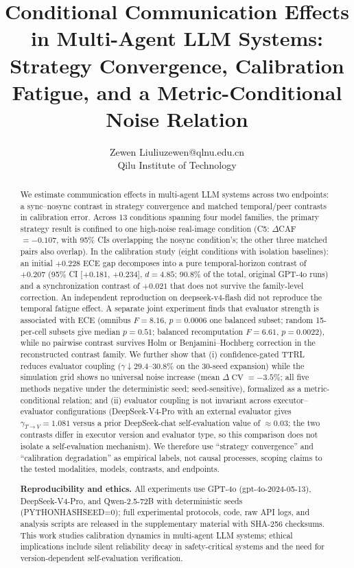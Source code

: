 \documentclass[11pt]{article}
\title{Conditional Communication Effects in Multi-Agent LLM Systems: Strategy Convergence, Calibration Fatigue, and a Metric-Conditional Noise Relation}
\author{\name Zewen Liu\email liuzewen@qlnu.edu.cn\\\addr Qilu Institute of Technology}  %
\date{}
\DeclareMathOperator{\CV}{CV}
\begin{document}
\maketitle

\begin{abstract}
We estimate communication effects in multi-agent LLM systems across two endpoints: a sync--nosync contrast in strategy convergence and matched temporal/peer contrasts in calibration error. Across 13 conditions spanning four model families, the primary strategy result is confined to one high-noise real-image condition (C5: $\Delta$CAF $=-0.107$, with 95\% CIs overlapping the nosync condition's; the other three matched pairs also overlap). In the calibration study (eight conditions with isolation baselines): an initial $+0.228$ ECE gap decomposes into a pure temporal-horizon contrast of $+0.207$ (95\% CI [+0.181, +0.234], $d{=}4.85$; 90.8\% of the total, original GPT-4o runs) and a synchronization contrast of $+0.021$ that does not survive the family-level correction. An independent reproduction on deepseek-v4-flash did not reproduce the temporal fatigue effect. A separate joint experiment finds that evaluator strength is associated with ECE (omnibus $F{=}8.16$, $p{=}0.0006$ one balanced subset; random 15-per-cell subsets give median $p{=}0.51$; balanced recomputation $F{=}6.61$, $p{=}0.0022$), while no pairwise contrast survives Holm or Benjamini--Hochberg correction in the reconstructed contrast family. We further show that (i) confidence-gated TTRL reduces evaluator coupling ($\gamma \downarrow 29.4$--$30.8\%$ on the 30-seed expansion) while the simulation grid shows no universal noise increase (mean $\Delta\CV = -3.5\%$; all five methods negative under the deterministic seed; seed-sensitive), formalized as a metric-conditional relation; and (ii) evaluator coupling is not invariant across executor--evaluator configurations (DeepSeek-V4-Pro with an external evaluator gives $\gamma_{T\to V}{=}1.081$ versus a prior DeepSeek-chat self-evaluation value of $\approx 0.03$; the two contrasts differ in executor version and evaluator type, so this comparison does not isolate a self-evaluation mechanism). We therefore use ``strategy convergence'' and ``calibration degradation'' as empirical labels, not causal processes, scoping claims to the tested modalities, models, contrasts, and endpoints.


	\textbf{Reproducibility and ethics.} All experiments use GPT-4o (gpt-4o-2024-05-13), DeepSeek-V4-Pro, and Qwen-2.5-72B with deterministic seeds (PYTHONHASHSEED=0); full experimental protocols, code, raw API logs, and analysis scripts are released in the supplementary material with SHA-256 checksums. This work studies calibration dynamics in multi-agent LLM systems; ethical implications include silent reliability decay in safety-critical systems and the need for version-dependent self-evaluation verification.\end{abstract}
\end{document}
